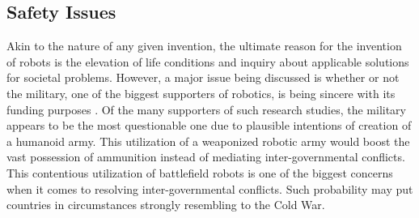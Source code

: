 \documentclass[man]{apa6}
\begin{document}
\subsection{Safety Issues}
Akin to the nature of any given invention, the ultimate reason for the invention of robots is the elevation of life conditions and inquiry about applicable solutions for societal problems.
However, a major issue being discussed is whether or not the military, one of the biggest supporters of robotics, is being sincere with its funding purposes \cite{gre}.
Of the many supporters of such research studies, the military appears to be the most questionable one due to plausible intentions of creation of a humanoid army.
This utilization of a weaponized robotic army would boost the vast possession of ammunition instead of mediating inter-governmental conflicts.
This contentious utilization of battlefield robots is one of the biggest concerns when it comes to resolving inter-governmental conflicts.
Such probability may put countries in circumstances strongly resembling to the Cold War. \par


 
\end{document}
